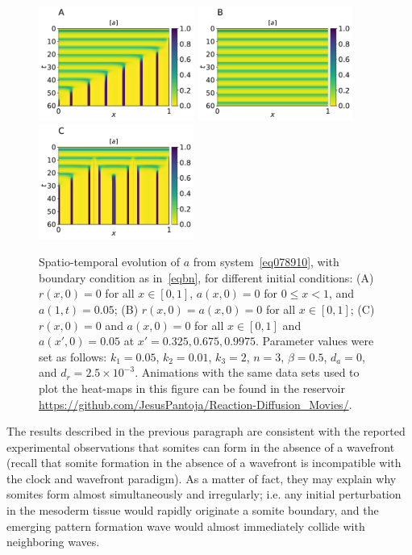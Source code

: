 \documentclass[%
 preprint,
 aip, 
 amsmath,amssymb,
]{revtex4-2}
\begin{document}
	\begin{figure}[t!]
		\centering
		\includegraphics[width=2in]{Figures/Fig02aRev.pdf}
		\includegraphics[width=2in]{Figures/Fig02bRev.pdf}
		\includegraphics[width=2in]{Figures/Fig02cRev.pdf}
		\caption{Spatio-temporal evolution of $a$ from system~\eqref{eq078910}, with
			boundary condition as in~\eqref{eqbn}, for different initial conditions: (A)
			$r(x, 0)=0$ for all $x\in[0,1]$, $a(x, 0)=0$ for $0\leq x<1$, and $a(1, t) =
			0.05$; (B) $r(x, 0) = a(x, 0)=0$ for all $x\in[0,1]$; (C) $r(x, 0)=0$ and $a(x,
			0)=0$ for all $x\in[0,1]$ and $a(x',0)=0.05$ at $x'=0.325, 0.675, 0.9975$.
			Parameter values were set as follows: $k_1=0.05$, $k_2=0.01$, $k_3=2$, $n=3$,
			$\beta=0.5$, $d_a=0$, and $d_r=2.5\times10^{-3}$. Animations with the same 
			data sets used to plot the heat-maps in this figure can be found in the 
			reservoir \url{https://github.com/JesusPantoja/Reaction-Diffusion_Movies/}.}
		\label{Fig02}
	\end{figure}
	
	The results described in the previous paragraph are consistent with the reported
	experimental observations that somites can form in the absence of a wavefront
	(recall that somite formation in the absence of a wavefront is incompatible with 
	the clock and wavefront paradigm). As a matter of fact, they may explain why somites 
	form almost simultaneously and irregularly; i.e. any initial perturbation in the 
	mesoderm tissue would rapidly originate a somite boundary, and the emerging pattern 
	formation wave would almost immediately collide with neighboring waves. 
	
\end{document}
